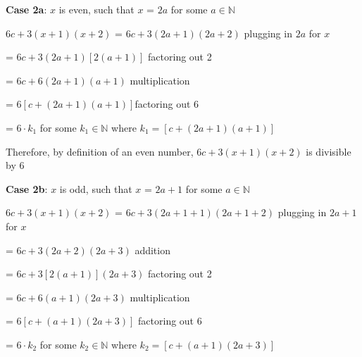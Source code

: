 \documentclass{article} %
\begin{document}
    \tabto*{2cm} \textbf{Case 2a}: $x$ is even, such that $x$ = $2a$ for some $a \in \mathbb{N}$
    \vspace*{0.08cm}

    \tabto*{2cm} $6c + 3(x+1)(x+2)$ = $6c + 3(2a + 1)(2a + 2)$ \tabto*{9.5cm}plugging in $2a$ for $x$
    \vspace*{0.08cm}

    \tabto*{5.24cm} = $6c + 3(2a + 1)[2(a + 1)]$ \tabto*{9.5cm}factoring out 2
    \vspace*{0.08cm}

    \tabto*{5.24cm} = $6c + 6(2a + 1)(a + 1)$ \tabto*{9.5cm}multiplication
    \vspace*{0.08cm}
    
    \tabto*{5.24cm} = $6[c + (2a + 1)(a + 1)]$\tabto*{9.5cm}factoring out 6
    \vspace*{0.08cm}

    \tabto*{5.24cm} = $6 \cdot k_{1}$ for some $k_{1} \in \mathbb{N}$ where $k_{1} = [c + (2a + 1)(a + 1)]$


    \tabto*{2cm} Therefore, by definition of an even number, $6c + 3(x+1)(x+2)$ is divisible by 6
    \vspace*{0.3cm}

    \tabto*{2cm} \textbf{Case 2b}: $x$ is odd, such that $x$ = $2a + 1$ for some $a \in \mathbb{N}$
    \vspace*{0.08cm}

    \tabto*{2cm} $6c + 3(x+1)(x+2)$ = $6c + 3(2a+1 + 1)(2a+1 + 2)$ \tabto*{10.4cm}plugging in $2a+1$ for $x$
    \vspace*{0.08cm}

    \tabto*{5.24cm} = $6c + 3(2a+2)(2a+3)$ \tabto*{10.4cm}addition
    \vspace*{0.08cm}

    \tabto*{5.24cm} = $6c + 3[2(a+1)](2a+3)$ \tabto*{10.4cm}factoring out 2
    \vspace*{0.08cm}

    \tabto*{5.24cm} = $6c + 6(a+1)(2a+3)$ \tabto*{10.4cm}multiplication
    \vspace*{0.08cm}

    \tabto*{5.24cm} = $6[c + (a+1)(2a+3)]$ \tabto*{10.4cm}factoring out 6
    \vspace*{0.08cm}
    
    \tabto*{5.24cm} = $6 \cdot k_{2}$ for some $k_{2} \in \mathbb{N}$ where $k_{2} = [c + (a+1)(2a+3)]$
\end{document}
